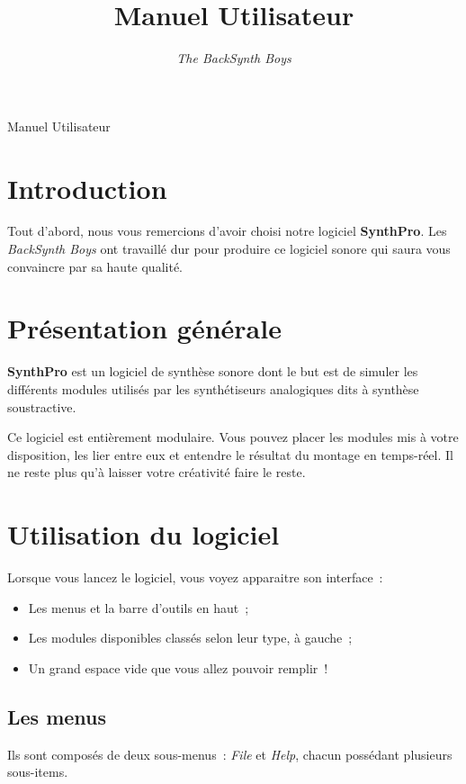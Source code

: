 \documentclass[a4paper,oneside,frenchb,10pt]{article}
\title{Manuel Utilisateur}
\author{\emph{The BackSynth Boys}}
\begin{document}
\thispagestyle{empty}

\begin{center}
\huge Manuel Utilisateur
\end{center}

\vspace{1cm}

\tableofcontents

\section{Introduction}

Tout d'abord, nous vous remercions d'avoir choisi notre logiciel
\textbf{SynthPro}. Les \emph{BackSynth Boys} ont travaillé dur pour produire ce logiciel
sonore qui saura vous convaincre par sa haute qualité.

\section{Présentation générale}

\textbf{SynthPro} est un logiciel de synthèse sonore dont le but est de 
simuler les différents modules utilisés par les synthétiseurs analogiques
dits à synthèse soustractive.

Ce logiciel est entièrement modulaire. Vous pouvez placer les modules
mis à votre disposition, les lier entre eux et entendre le résultat du
montage en temps-réel. Il ne reste plus qu'à laisser votre créativité
faire le reste.

\section{Utilisation du logiciel}

Lorsque vous lancez le logiciel, vous voyez apparaitre son interface~:

\begin{itemize}
\item
  Les menus et la barre d'outils en haut~;
\item
  Les modules disponibles classés selon leur type, à gauche~;
\item
  Un grand espace vide que vous allez pouvoir remplir~!
\end{itemize}
\subsection{Les menus}

Ils sont composés de deux sous-menus~: \emph{File} et \emph{Help}, chacun 
possédant plusieurs sous-items.
\end{document}
